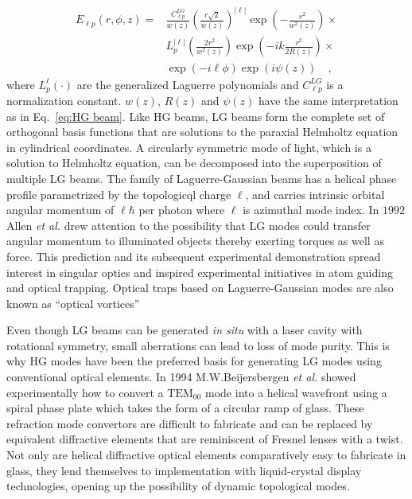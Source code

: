 \begin{equation}
\label{eq: LG Beam}
\begin{split}
E_{\ell p}(r,\phi, z) = & \frac{C^{LG}_{\ell p}}{w(z)}\left(\frac{r\sqrt{2}}{w(z)}\right) ^{|\ell|}\exp \left(-\frac{r^2}{w^2 (z)}\right) \times \\
							& L^{|\ell|}_{p}\left(\frac{2r^2}{w^2(z)}\right) \exp \left( -ik\frac{r^2}{2R(z)}\right) \times \\
							& \exp (-i\ell\phi) \exp (i\psi(z)) \quad ,
\end{split}
\end{equation}
where $L^{\ell}_{p} (\cdot)$ are the generalized Laguerre polynomials and $C^{LG}_{\ell p}$ is a normalization constant. $w(z)$, $R(z)$ and $\psi (z)$ have the same interpretation as in Eq.~\eqref{eq:HG beam}. Like HG beams, LG beams form the complete set of orthogonal basis functions that are solutions to the paraxial Helmholtz equation in cylindrical coordinates. A circularly symmetric mode of light, which is a solution to Helmholtz equation, can be decomposed into the superposition of multiple LG beams. The family of Laguerre-Gaussian beams has a helical phase profile parametrized by the topologicql charge $\ell$, and carries intrinsic orbital angular momentum of $\ell \hbar$ per photon \cite{allen1992} where $\ell$ is azimuthal mode index. In $\mathrm{1992}$ Allen \emph{et al.} drew attention to the possibility that LG modes could transfer angular momentum to illuminated objects thereby exerting torques as well as force. This prediction and its subsequent experimental demonstration spread interest in singular optics and inspired experimental initiatives in atom guiding and optical trapping. Optical traps based on Laguerre-Gaussian modes are also known as ``optical vortices'' 

Even though LG beams can be generated \emph{in situ} with a laser cavity with rotational symmetry, small aberrations can lead to loss of mode purity. This is why HG modes have been the preferred basis for generating LG modes using conventional optical elements. In 1994 M.W.Beijersbergen \emph{et al.} \cite{BEIJERSBERGEN1994321} showed experimentally how to convert a $\mathrm{TEM}_{00}$ mode into a helical wavefront using a spiral phase plate \cite{Ruffato:14} which takes the form of a circular ramp of glass. These refraction mode convertors are difficult to fabricate and can be replaced by equivalent diffractive elements that are reminiscent of Fresnel lenses with a twist. Not only are helical diffractive optical elements comparatively easy to fabricate in glass, they lend themselves to implementation with liquid-crystal display technologies, opening up the possibility of dynamic topological modes.


